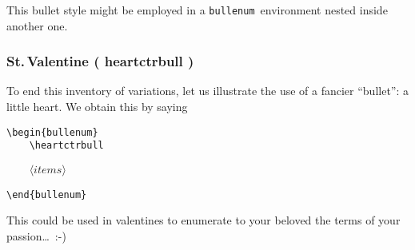 \documentclass[a4paper]{article}
\DeclareRobustCommand*{\command}[1]{%
	{\texorpdfstring{\normalfont\ttfamily \char\escapechar}{\pdfbslash}#1}%
}
\DeclareRobustCommand*{\meta}[1]{\mbox{\(\langle\textit{#1}\rangle\)}}
\DeclareRobustCommand*{\env}[1]{\texttt{#1}}
\newcommand*{\Bullenum}{bullenum}
\newcommand*{\beenv}{\env{\Bullenum}}
\newcommand*{\pdfbslash}{}
{\catcode`\|=0 |catcode`|\=12 |gdef|pdfbslash{\\}}
\begin{document}
This bullet style might be employed in a \beenv\ environment nested
inside another one.



\subsubsection{St.\texorpdfstring{\,}{ }Valentine (\command{heartctrbull})}
\label{SSS:Xmp-Hearts}

To end this inventory of variations, let us illustrate the use of a
fancier ``bullet'': a little heart.  We obtain this by saying
%
\begin{verbatim}
\begin{bullenum}
    \heartctrbull
\end{verbatim}
\begin{flushleft}
	\texttt{\ \ \ \ }\meta{items}
\end{flushleft}
\begin{verbatim}
\end{bullenum}
\end{verbatim}
%
This could be used in valentines to enumerate to your beloved the
terms of your passion\ldots~:-)
\end{document}
